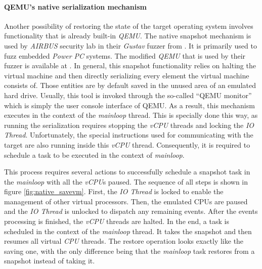 \paragraph{QEMU's native serialization mechanism} \label{sec:qemu_nat}
Another possibility of restoring the state of the target operating system involves functionality that is already built-in \textit{QEMU}. The native snapshot mechanism is used by \textit{AIRBUS} security lab in their \textit{Gustav} fuzzer from \cite{gustavdoc}. It is primarily used to fuzz embedded \textit{Power PC} systems. The modified \textit{QEMU} that is used by their fuzzer is available at \cite{airbusqemu}. In general, this snapshot functionality relies on halting the virtual machine and then directly serializing every element the virtual machine consists of. Those entities are by default saved in the unused area of an emulated hard drive. Usually, this tool is invoked through the so-called “QEMU monitor” which is simply the user console interface of QEMU. As a result, this mechanism executes in the context of the \textit{mainloop} thread. This is specially done this way, as running the serialization requires stopping the \textit{vCPU} threads and locking the \textit{IO Thread}. Unfortunately, the special instructions used for communicating with the target are also running inside this \textit{vCPU} thread. Consequently, it is required to schedule a task to be executed in the context of \textit{mainloop}.

This process requires several actions to successfully schedule a snapshot task in the \textit{mainloop} with all the \textit{vCPU}s paused. The sequence of all steps is shown in figure \ref{fig:native_savevm}. First, the \textit{IO Thread} is locked to enable the management of other virtual processors. Then, the emulated CPUs are paused and the \textit{IO Thread} is unlocked to dispatch any remaining events. After the events processing is finished, the \textit{vCPU} threads are halted. In the end, a task is scheduled in the context of the \textit{mainloop} thread. It takes the snapshot and then resumes all virtual \textit{CPU} threads. The restore operation looks exactly like the saving one, with the only difference being that the \textit{mainloop} task restores from a snapshot instead of taking it.

